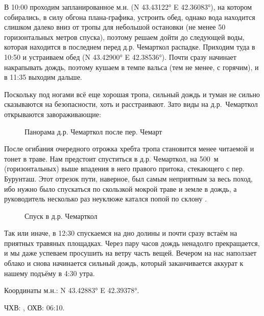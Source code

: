 																В 10:00 проходим запланированное м.н. (N 43.43122° E 42.36083°), на котором собирались, в силу обгона плана-графика, устроить обед, однако вода находится слишком далеко вниз от тропы для небольшой остановки (не менее 50 горизонтальных метров спуска), поэтому решаем дойти до следующей воды, которая находится в последнем перед д.р. Чемарткол распадке. Приходим туда в 10:50 и устраиваем обед (N 43.42900° E 42.38536°). Почти сразу начинает накрапывать дождь, поэтому кушаем в темпе вальса (тем не менее, с горячим), и в 11:35 выходим дальше. 
																
																Поскольку под ногами всё еще хорошая тропа, сильный дождь и туман не сильно сказываются на безопасности, хоть и расстраивают. Зато виды на д.р.~Чемарткол открываются завораживающие:
																
\begin{figure}[h!]
	\centering
	\caption{Панорама д.р. Чемарткол после пер. Чемарт}
	\label{fig:chemart_panorama}
\end{figure}										

После огибания очередного отрожка хребта тропа становится менее читаемой и тонет в траве. Нам предстоит спуститься в д.р. Чемарткол, на 500~м (горизонтальных) выше впадения в него правого притока, стекающего с пер. Бурунташ. Этот отрезок пути, наверное, был самым неприятным за весь поход, ибо нужно было спускаться по скользкой мокрой траве и земле в дождь, а руководитель несколько раз неуклюже катался попой по склону \smiley.

\begin{figure}[h!]
	\centering
	\caption{Спуск в д.р. Чемарткол}
	\label{fig:downhill}
\end{figure}



Так или иначе, в 12:30 спускаемся на дно долины и почти сразу встаём на приятных травяных площадках. Через пару часов дождь ненадолго прекращается, и мы даже успеваем просушить на ветру часть вещей. Вечером на нас наползает облако и снова начинается сильный дождь, который заканчивается аккурат к нашему подъёму в 4:30 утра.

Координаты м.н.: N 43.42883° E 42.39378°.

ЧХВ: , ОХВ: 06:10.
											
\clearpage